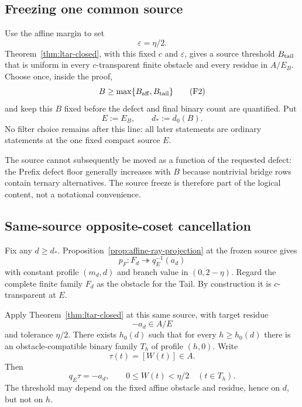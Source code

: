 \subsection{Freezing one common source}

Use the affine margin to set
\[
\varepsilon=\eta/2.
\]
Theorem~\ref{thm:ltar-closed}, with this fixed $c$ and $\varepsilon$, gives a
source threshold $B_{\rm tail}$ that is uniform in every $c$-transparent
finite obstacle and every residue in $A/E_B$.  Choose once, inside the proof,
\[
B\ge\max\{B_{\rm aff},B_{\rm tail}\}
\tag{F2}\label{eq:source-freeze}
\]
and keep this $B$ fixed before the defect and final binary count are quantified.
Put
\[
E:=E_B,
\qquad
d_*:=d_0(B).
\tag{F3}\label{eq:defect-threshold}
\]
No filter choice remains after this line: all later statements are ordinary
statements at the one fixed compact source $E$.

The source cannot subsequently be moved as a function of the requested defect:
the Prefix defect floor generally increases with $B$ because nontrivial bridge
rows contain ternary alternatives.  The source freeze is therefore part of the
logical content, not a notational convenience.

\subsection{Same-source opposite-coset cancellation}

Fix any $d\ge d_*$.  Proposition~\ref{prop:affine-ray-projection} at the frozen
source gives
\[
p_F:F_d\twoheadrightarrow q_E^{-1}(a_d)
\tag{F4}\label{eq:affine-coset-cover}
\]
with constant profile $(m_d,d)$ and branch value in $(0,2-\eta)$.  Regard the
complete finite family $F_d$ as the obstacle for the Tail.  By construction it
is $c$-transparent at $E$.

Apply Theorem~\ref{thm:ltar-closed} at this same source, with target residue
\[
-a_d\in A/E
\]
and tolerance $\eta/2$.  There exists $h_0(d)$ such that for every
$h\ge h_0(d)$ there is an obstacle-compatible binary family $T_h$ of profile
$(h,0)$.  Write
\[
\tau(t)=[W(t)]\in A.
\]
Then
\[
q_E\tau=-a_d,
\qquad
0\le W(t)<\eta/2
\quad(t\in T_h).
\tag{F5}\label{eq:tail-opposite-residue}
\]
The threshold may depend on the fixed affine obstacle and residue, hence on
$d$, but not on $h$.

